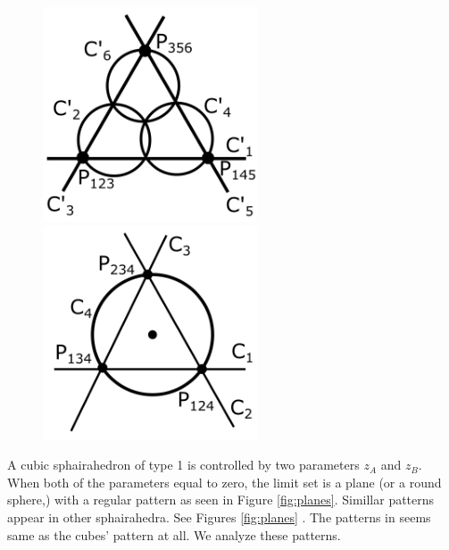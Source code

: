 \documentclass[suppldata, dvipdfmx]{interact}
\theoremstyle{plain}%
\theoremstyle{definition}
\theoremstyle{remark}
\theoremstyle{problemstyle}
\begin{document}
\begin{figure}[h!tbp]
 \begin{minipage}[t]{0.5\textwidth}
 \centering
 \includegraphics[width=2.5in,
 keepaspectratio]{./img/Observation/triangle.jpg}
 \caption{}
 \label{fig:patternTetrahedron}
 \end{minipage}
 \hspace*{\fill}
 \begin{minipage}[t]{0.5\textwidth}
  \centering
  \includegraphics[width=2.5in,
  keepaspectratio]{./img/Observation/triangle2.jpg}
  \caption{}
  \label{fig:obsTriangle}
 \end{minipage}
 \hspace*{\fill}
\end{figure}

A cubic sphairahedron of type 1 is controlled by two parameters $z_A$ and $z_B$.
When both of the parameters equal to zero, 
the limit set is a plane (or a round sphere,) with a regular pattern as seen in Figure \ref{fig:planes}.
Simillar patterns appear in other sphairahedra.  
See Figures \ref{fig:planes}
.
The patterns in 
seems same as the cubes' pattern at all.  
We analyze these patterns.
\end{document}
